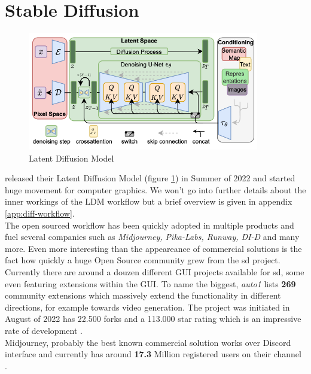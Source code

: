 \documentclass[
  a4paper,  %
  twoside,  %
  bibliography=totoc,
  headsepline,
  cleardoublepage=empty,
  parskip=half,
  draft=false
]{scrbook}
\begin{document}
\section{Stable Diffusion}
\label{sec:stable-diffusion-bg}
\begin{figure}[h]
  \centering
  \includegraphics[width=0.9\textwidth]{./graphics/images/latent-diffusion.png}
  \caption{Latent Diffusion Model \cite{rombachHighResolutionImageSynthesis2022}}
  \label{fig:ldm-arch}
\end{figure}
\citet{rombachHighResolutionImageSynthesis2022} released their Latent Diffusion Model (figure \ref{fig:ldm-arch}) in Summer of 2022 and started huge movement for computer graphics. We won't go into further details about the inner workings of the LDM workflow but a brief overview is given in appendix \ref{app:diff-workflow}.\\
The open sourced workflow has been quickly adopted in multiple products and fuel several companies such as \textit{Midjourney, Pika-Labs, Runway, DI-D} and many more. Even more interesting than the appeareance of commercial solutions is the fact how quickly a huge Open Source community grew from the \gls{sd} project. Currently there are around a douzen different GUI projects available for \gls{sd}, some even featuring extensions within the GUI. To name the biggest, \textit{\gls{auto1}} lists \textbf{269} community extensions which massively extend the functionality in different directions, for example towards video generation. The project was initiated in August of 2022 has 22.500 forks and a 113.000 star rating which is an impressive rate of development \cite{AUTOMATIC1111StablediffusionwebuiStable}. \\
Midjourney, probably the best known commercial solution works over Discord interface and currently has around \textbf{17.3} Million registered users on their channel \cite{midjourneyJoinMidjourneyDiscord}. \\
\end{document}
